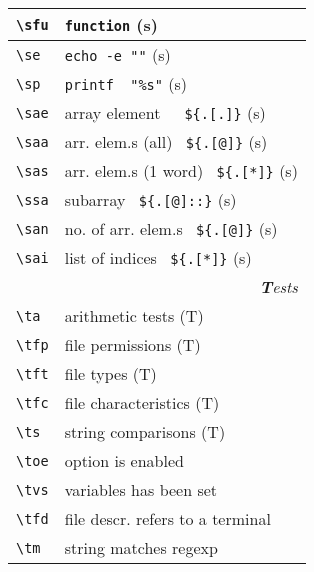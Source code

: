 \documentclass[oneside,11pt,landscape,DIV16]{scrartcl}
\begin{document}
\begin{multicols}{3}
\begin{center}
\begin{tabular}[]{|p{11mm}|p{60mm}|}
\hline \verb'\sfu' & \verb'function'                       \hfill (s)\\
%
\hline \verb'\se'  & \verb'echo -e ""'                     \hfill (s)\\
\hline \verb'\sp'  & \verb'printf  "%s"'                   \hfill (s)\\
%
\hline \verb'\sae' & array element\ \ \ \verb'${.[.]}'     \hfill (s)\\
\hline \verb'\saa' & arr. elem.s (all) \ \verb'${.[@]}'    \hfill (s)\\
\hline \verb'\sas' & arr. elem.s (1 word) \ \verb'${.[*]}' \hfill (s)\\
\hline \verb'\ssa' & subarray \ \verb'${.[@]::}'           \hfill (s)\\
\hline \verb'\san' & no. of arr. elem.s \ \verb'${.[@]}'   \hfill (s)\\
\hline \verb'\sai' & list of indices \ \verb'${.[*]}'      \hfill (s)\\
\hline
\hline
\multicolumn{2}{|r|}{\textsl{\textbf{T}ests}}                 \\[1.0ex]
\hline \verb'\ta'  & arithmetic tests                  \hfill (T)\\
\hline \verb'\tfp' & file permissions                  \hfill (T)\\
\hline \verb'\tft' & file types                        \hfill (T)\\
\hline \verb'\tfc' & file characteristics              \hfill (T)\\
\hline \verb'\ts'  & string comparisons                \hfill (T)\\
\hline \verb'\toe' & option is enabled                 \\
\hline \verb'\tvs' & variables has been set            \\
\hline \verb'\tfd' & file descr.  refers to a terminal \\
\hline \verb'\tm'  & string matches regexp             \\
\hline
\end{tabular}\\
%

\end{center}
\end{multicols}
\end{document}
